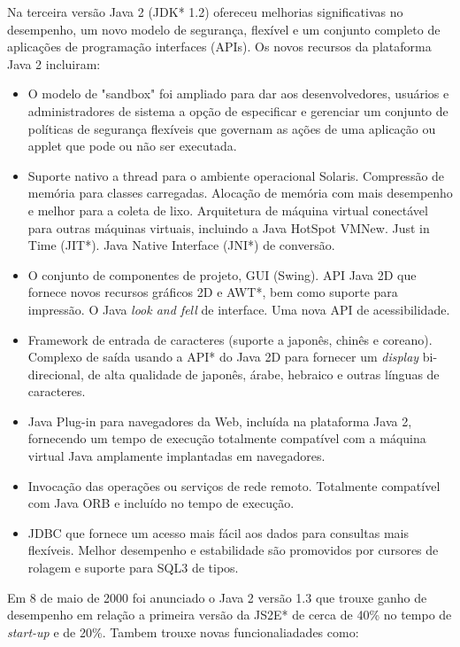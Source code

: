 Na terceira versão Java 2 (JDK* 1.2) ofereceu melhorias significativas no desempenho, um novo modelo de segurança, flexível e um conjunto completo de aplicações de programação interfaces (APIs). Os novos recursos da plataforma Java 2 incluiram: 
\begin{itemize}
  \item O modelo de "sandbox"  foi ampliado para dar aos desenvolvedores, usuários e administradores de sistema a opção de especificar e gerenciar um conjunto de políticas de segurança flexíveis que governam as ações de uma aplicação ou applet que pode ou não ser executada.
  \item Suporte nativo a thread para o ambiente operacional Solaris. Compressão de memória para classes carregadas. Alocação de memória com mais desempenho e melhor para a coleta de lixo. Arquitetura de máquina virtual conectável para outras máquinas virtuais, incluindo a Java HotSpot VMNew. Just in Time (JIT*). Java Native Interface (JNI*) de conversão.
  \item O conjunto de componentes de projeto, GUI (Swing). API Java 2D que fornece novos recursos gráficos 2D e AWT*, bem como suporte para impressão. O Java {\it look and fell} de interface. Uma nova API de acessibilidade.
  \item Framework de entrada de caracteres (suporte a japonês, chinês e coreano). Complexo de saída usando a API* do Java 2D para fornecer um {\it display} bi-direcional, de alta qualidade de japonês, árabe, hebraico e outras línguas de caracteres.
  \item Java Plug-in para navegadores da Web, incluída na plataforma Java 2, fornecendo um tempo de execução totalmente compatível com a máquina virtual Java amplamente implantadas em navegadores.
  \item Invocação das operações ou serviços de rede remoto. Totalmente compatível com Java ORB e incluído no tempo de execução.
  \item JDBC que fornece um acesso mais fácil aos dados para consultas mais flexíveis. Melhor desempenho e estabilidade são promovidos por cursores de rolagem e suporte para SQL3 de tipos.\\
\end{itemize}

Em 8 de maio de 2000 foi anunciado o Java 2 versão 1.3 que trouxe ganho de desempenho em relação a primeira versão da JS2E* de cerca de 40\%  no tempo de {\it  start-up} e de 20\%. Tambem trouxe novas funcionaliadades como: 


